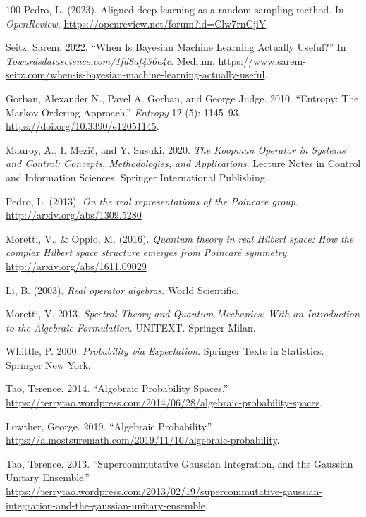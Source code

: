 \documentclass[11pt]{book}
\begin{document}
\begin{thebibliography}{100}
 Pedro, L. (2023). Aligned deep learning as a random sampling method. In
\emph{OpenReview}. \url{https://openreview.net/forum?id=Clw7rnCjiY}

 Seitz, Sarem. 2022. {``When Is Bayesian Machine Learning Actually
Useful?''} In \emph{Towardsdatascience.com/1fd8af456e4c}. Medium.
\url{https://www.sarem-seitz.com/when-is-bayesian-machine-learning-actually-useful}.

 Gorban, Alexander N., Pavel A. Gorban, and George Judge. 2010.
{``Entropy: The Markov Ordering Approach.''} \emph{Entropy} 12 (5):
1145--93. \url{https://doi.org/10.3390/e12051145}.

 Mauroy, A., I. Mezić, and Y. Susuki. 2020. \emph{The Koopman Operator in
Systems and Control: Concepts, Methodologies, and Applications}. Lecture
Notes in Control and Information Sciences. Springer International
Publishing.

 Pedro, L. (2013). \emph{On the real representations of the Poincare
group}. \url{http://arxiv.org/abs/1309.5280}

 Moretti, V., \& Oppio, M. (2016). \emph{Quantum theory in real Hilbert
space: How the complex Hilbert space structure emerges from Poincaré
symmetry}. \url{http://arxiv.org/abs/1611.09029}

 Li, B. (2003). \emph{Real operator algebras}. World Scientific.

 Moretti, V. 2013. \emph{Spectral Theory and Quantum Mechanics: With an
Introduction to the Algebraic Formulation}. UNITEXT. Springer Milan.

 Whittle, P. 2000. \emph{Probability via Expectation}. Springer Texts in
Statistics. Springer New York.

 Tao, Terence. 2014. {``Algebraic Probability Spaces.''}
\url{https://terrytao.wordpress.com/2014/06/28/algebraic-probability-spaces}.

 Lowther, George. 2019. {``Algebraic Probability.''}
\url{https://almostsuremath.com/2019/11/10/algebraic-probability}.

 Tao, Terence. 2013. {``Supercommutative Gaussian Integration, and the
Gaussian Unitary Ensemble.''}
\url{https://terrytao.wordpress.com/2013/02/19/supercommutative-gaussian-integration-and-the-gaussian-unitary-ensemble}.


\end{thebibliography}
\end{document}
